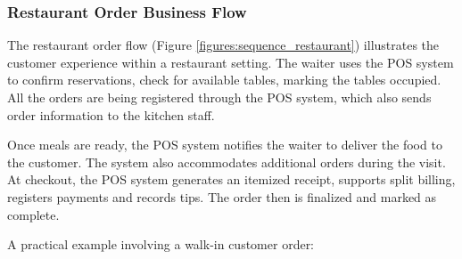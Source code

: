 \documentclass[11pt,a4paper,pdftex]{article}
\begin{document}
\subsubsection{Restaurant Order Business Flow}
The restaurant order flow (Figure \ref{figures:sequence_restaurant}) illustrates the customer experience within a restaurant setting. The waiter uses the POS system to confirm reservations, check for available tables, marking the tables occupied. All the orders are being registered through the POS system, which also sends order information to the kitchen staff.

Once meals are ready, the POS system notifies the waiter to deliver the food to the customer. The system also accommodates additional orders during the visit. At checkout, the POS system generates an itemized receipt, supports split billing, registers payments and records tips. The order then is finalized and marked as complete. 

A practical example involving a walk-in customer order:
\end{document}
